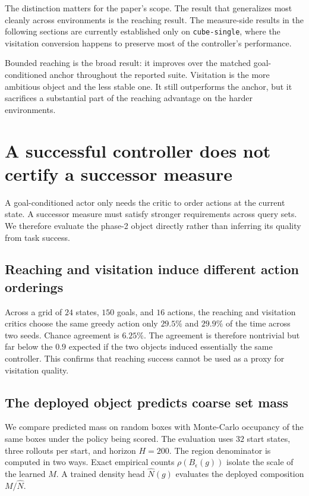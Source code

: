 \documentclass{article}
\begin{document}
The distinction matters for the paper's scope. The result that generalizes most
cleanly across environments is the reaching result. The measure-side results in
the following sections are currently established only on \texttt{cube-single},
where the visitation conversion happens to preserve most of the controller's
performance.

\begin{finding}
Bounded reaching is the broad result: it improves over the matched
goal-conditioned anchor throughout the reported suite. Visitation is the more
ambitious object and the less stable one. It still outperforms the anchor, but it
sacrifices a substantial part of the reaching advantage on the harder
environments.
\end{finding}

\section{A successful controller does not certify a successor measure}
\label{sec:measure-validity}

A goal-conditioned actor only needs the critic to order actions at the current
state. A successor measure must satisfy stronger requirements across query sets.
We therefore evaluate the phase-2 object directly rather than inferring its
quality from task success.

\subsection{Reaching and visitation induce different action orderings}

Across a grid of $24$ states, $150$ goals, and $16$ actions, the reaching and
visitation critics choose the same greedy action only $29.5\%$ and $29.9\%$ of the
time across two seeds. Chance agreement is $6.25\%$. The agreement is therefore
nontrivial but far below the $0.9$ expected if the two objects induced essentially
the same controller. This confirms that reaching success cannot be used as a proxy
for visitation quality.

\subsection{The deployed object predicts coarse set mass}
\label{sec:set-calibration}

We compare predicted mass on random boxes with Monte-Carlo occupancy of the same
boxes under the policy being scored. The evaluation uses $32$ start states, three
rollouts per start, and horizon $H=200$. The region denominator is computed in two
ways. Exact empirical counts $\rho(B_\epsilon(g))$ isolate the scale of the learned
$M$. A trained density head $\hat N(g)$ evaluates the deployed composition
$M/\hat N$.
\end{document}
